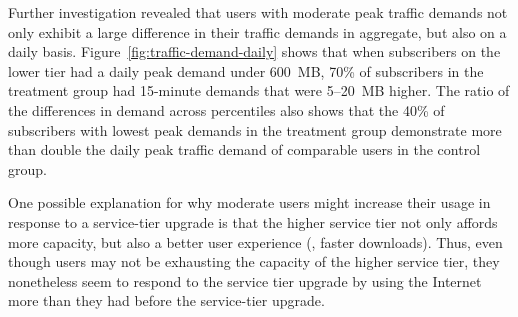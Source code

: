 Further investigation revealed that users with moderate peak traffic
demands not only exhibit a large difference in their traffic demands in aggregate, but also
on a daily basis.  Figure~\ref{fig:traffic-demand-daily} shows that
when subscribers on the lower tier had a daily peak demand under 600~MB,
70\% of subscribers in the treatment group had 15-minute demands that
were 5--20~MB higher.  The ratio of the differences in demand across
percentiles also shows that the 40\% of subscribers with lowest peak
demands in the treatment group demonstrate more than
double the daily peak traffic demand of comparable users in the control group.

One possible explanation for why moderate users might increase their usage
in response to a service-tier upgrade is that the higher service tier
not only affords more capacity, but also a better user experience
(\eg, faster downloads).  Thus, even though users may not be
exhausting the capacity of the higher service tier, they nonetheless
seem to respond to the service tier upgrade by using the Internet more
than they had before the service-tier upgrade.

%

